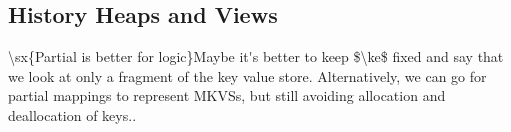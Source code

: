 \subsection{History Heaps and Views}
\label{sec:mkvs-view}





\ac{\sx{Partial is better for logic}Maybe it's better to keep $\ke$ fixed and say that we look at only a 
fragment of the key value store. Alternatively, we can go for partial mappings to 
represent MKVSs, but still avoiding allocation and deallocation of keys.}.





